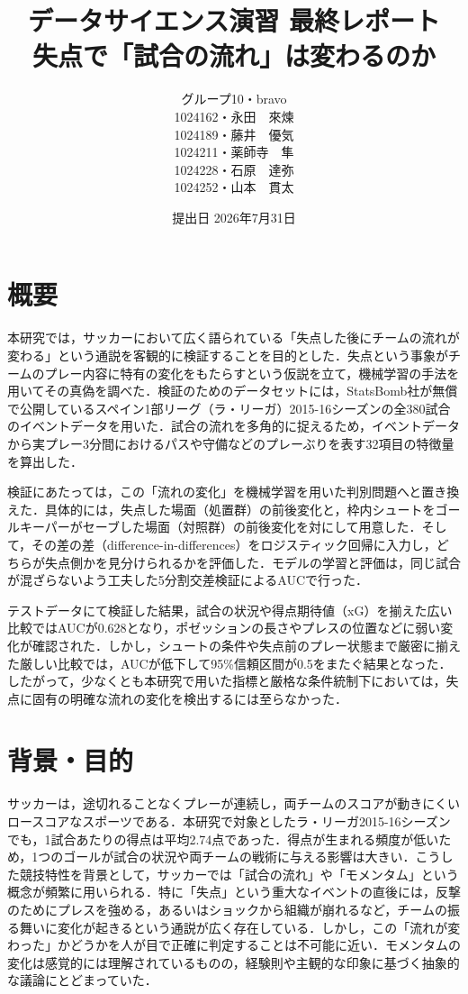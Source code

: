 \documentclass[11pt]{ujarticle} %
\title{データサイエンス演習 最終レポート\\失点で「試合の流れ」は変わるのか}
\author{%
グループ10・bravo\\
1024162・永田　來煉\\
1024189・藤井　優気\\
1024211・薬師寺　隼\\
1024228・石原　達弥\\
1024252・山本　貫太
}
\date{提出日 2026年7月31日}
\begin{document}
\maketitle
\clearpage

\section{概要}
本研究では，サッカーにおいて広く語られている「失点した後にチームの流れが変わる」という通説を客観的に検証することを目的とした．失点という事象がチームのプレー内容に特有の変化をもたらすという仮説を立て，機械学習の手法を用いてその真偽を調べた．検証のためのデータセットには，StatsBomb社が無償で公開しているスペイン1部リーグ（ラ・リーガ）2015-16シーズンの全380試合のイベントデータを用いた．試合の流れを多角的に捉えるため，イベントデータから実プレー3分間におけるパスや守備などのプレーぶりを表す32項目の特徴量を算出した．

検証にあたっては，この「流れの変化」を機械学習を用いた判別問題へと置き換えた．具体的には，失点した場面（処置群）の前後変化と，枠内シュートをゴールキーパーがセーブした場面（対照群）の前後変化を対にして用意した．そして，その差の差（difference-in-differences）をロジスティック回帰に入力し，どちらが失点側かを見分けられるかを評価した．モデルの学習と評価は，同じ試合が混ざらないよう工夫した5分割交差検証によるAUCで行った．  

テストデータにて検証した結果，試合の状況や得点期待値（xG）を揃えた広い比較ではAUCが0.628となり，ポゼッションの長さやプレスの位置などに弱い変化が確認された．しかし，シュートの条件や失点前のプレー状態まで厳密に揃えた厳しい比較では，AUCが低下して95\%信頼区間が0.5をまたぐ結果となった．したがって，少なくとも本研究で用いた指標と厳格な条件統制下においては，失点に固有の明確な流れの変化を検出するには至らなかった．  

\section{背景・⽬的}
サッカーは，途切れることなくプレーが連続し，両チームのスコアが動きにくいロースコアなスポーツである．本研究で対象としたラ・リーガ2015-16シーズンでも，1試合あたりの得点は平均2.74点であった．得点が生まれる頻度が低いため，1つのゴールが試合の状況や両チームの戦術に与える影響は大きい．こうした競技特性を背景として，サッカーでは「試合の流れ」や「モメンタム」という概念が頻繁に用いられる．特に「失点」という重大なイベントの直後には，反撃のためにプレスを強める，あるいはショックから組織が崩れるなど，チームの振る舞いに変化が起きるという通説が広く存在している．しかし，この「流れが変わった」かどうかを人が目で正確に判定することは不可能に近い．モメンタムの変化は感覚的には理解されているものの，経験則や主観的な印象に基づく抽象的な議論にとどまっていた．
\end{document}
